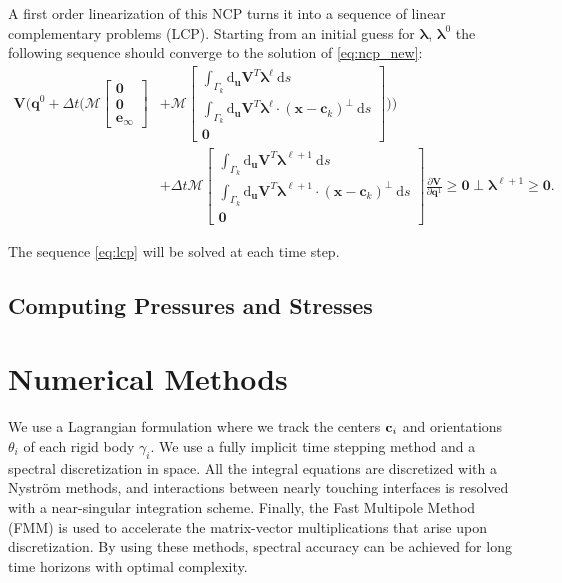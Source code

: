 \documentclass[preprint, 10pt]{elsarticle}
\begin{document}
A first order linearization of this NCP turns it into a sequence of linear complementary problems (LCP). Starting from an initial guess for $\pmb{\lambda}$, $\pmb{\lambda}^0$ the following sequence should converge to the solution of \eqref{eq:ncp_new}:
\begin{equation}\label{eq:lcp}\begin{aligned}
\mathbf{V}\biggl(\mathbf{q}^0 + \Delta t\biggl(\mathcal{M}\begin{bmatrix}\mathbf{0}\\\mathbf{0}\\\mathbf{e}_\infty\end{bmatrix} &+ \mathcal{M}\begin{bmatrix} \int_{\Gamma_k} \text{d}_\mathbf{u}\mathbf{V}^T\pmb{\lambda}^\ell~\text{d}s\\ \int_{\Gamma_k}  \text{d}_\mathbf{u}\mathbf{V}^T\pmb{\lambda}^\ell\cdot(\mathbf{x}-\mathbf{c}_k)^\perp~\text{d}s \\\mathbf{0}\end{bmatrix}\biggr)\biggr) \\
&+ \Delta t \mathcal{M}\begin{bmatrix}\int_{\Gamma_k} \text{d}_\mathbf{u}\mathbf{V}^T\pmb{\lambda}^{\ell+1}~\text{d}s\\ \int_{\Gamma_k}  \text{d}_\mathbf{u}\mathbf{V}^T\pmb{\lambda}^{\ell+1}\cdot(\mathbf{x}-\mathbf{c}_k)^\perp~\text{d}s \\\mathbf{0}\end{bmatrix}\frac{\partial\mathbf{V}}{\partial \mathbf{q}^1} \geq \mathbf{0} \perp \pmb{\lambda}^{\ell+1} \geq \mathbf{0}.\end{aligned}\end{equation}

The sequence \eqref{eq:lcp} will be solved at each time step. 

\subsection{Computing Pressures and Stresses}


		
\section{Numerical Methods\label{s:method}} 
We use a Lagrangian formulation where we track the centers ${\mathbf{c}}_i$ and
orientations $\theta_i$ of each rigid body $\gamma_i$.  We use a fully
implicit time stepping method and a spectral discretization in space.  All
the integral equations are discretized with a Nystr\"om  methods, and
interactions between nearly touching interfaces is resolved with a
near-singular integration scheme.  Finally, the Fast Multipole Method
(FMM) is used to accelerate the matrix-vector multiplications that arise
upon discretization.  By using these methods, spectral accuracy can be
achieved for long time horizons with optimal complexity.
\end{document}
